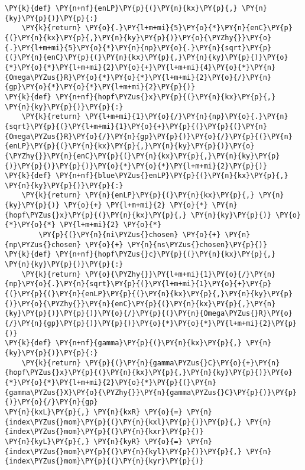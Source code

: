 \begin{Verbatim}[commandchars=\\\{\}]
\PY{k}{def} \PY{n+nf}{enLP}\PY{p}{(}\PY{n}{kx}\PY{p}{,} \PY{n}{ky}\PY{p}{)}\PY{p}{:}
    \PY{k}{return} \PY{o}{.}\PY{l+m+mi}{5}\PY{o}{*}\PY{n}{enC}\PY{p}{(}\PY{n}{kx}\PY{p}{,}\PY{n}{ky}\PY{p}{)}\PY{o}{\PYZhy{}}\PY{o}{.}\PY{l+m+mi}{5}\PY{o}{*}\PY{n}{np}\PY{o}{.}\PY{n}{sqrt}\PY{p}{(}\PY{n}{enC}\PY{p}{(}\PY{n}{kx}\PY{p}{,}\PY{n}{ky}\PY{p}{)}\PY{o}{*}\PY{o}{*}\PY{l+m+mi}{2}\PY{o}{+}\PY{l+m+mi}{4}\PY{o}{*}\PY{n}{Omega\PYZus{}R}\PY{o}{*}\PY{o}{*}\PY{l+m+mi}{2}\PY{o}{/}\PY{n}{gp}\PY{o}{*}\PY{o}{*}\PY{l+m+mi}{2}\PY{p}{)}
\PY{k}{def} \PY{n+nf}{hopf\PYZus{}x}\PY{p}{(}\PY{n}{kx}\PY{p}{,} \PY{n}{ky}\PY{p}{)}\PY{p}{:}
    \PY{k}{return} \PY{l+m+mi}{1}\PY{o}{/}\PY{n}{np}\PY{o}{.}\PY{n}{sqrt}\PY{p}{(}\PY{l+m+mi}{1}\PY{o}{+}\PY{p}{(}\PY{p}{(}\PY{n}{Omega\PYZus{}R}\PY{o}{/}\PY{n}{gp}\PY{p}{)}\PY{o}{/}\PY{p}{(}\PY{n}{enLP}\PY{p}{(}\PY{n}{kx}\PY{p}{,}\PY{n}{ky}\PY{p}{)}\PY{o}{\PYZhy{}}\PY{n}{enC}\PY{p}{(}\PY{n}{kx}\PY{p}{,}\PY{n}{ky}\PY{p}{)}\PY{p}{)}\PY{p}{)}\PY{o}{*}\PY{o}{*}\PY{l+m+mi}{2}\PY{p}{)}
\PY{k}{def} \PY{n+nf}{blue\PYZus{}enLP}\PY{p}{(}\PY{n}{kx}\PY{p}{,} \PY{n}{ky}\PY{p}{)}\PY{p}{:}
    \PY{k}{return} \PY{n}{enLP}\PY{p}{(}\PY{n}{kx}\PY{p}{,} \PY{n}{ky}\PY{p}{)} \PY{o}{+} \PY{l+m+mi}{2} \PY{o}{*} \PY{n}{hopf\PYZus{}x}\PY{p}{(}\PY{n}{kx}\PY{p}{,} \PY{n}{ky}\PY{p}{)} \PY{o}{*}\PY{o}{*} \PY{l+m+mi}{2} \PY{o}{*}
        \PY{p}{(}\PY{n}{ni\PYZus{}chosen} \PY{o}{+} \PY{n}{np\PYZus{}chosen} \PY{o}{+} \PY{n}{ns\PYZus{}chosen}\PY{p}{)}
\PY{k}{def} \PY{n+nf}{hopf\PYZus{}c}\PY{p}{(}\PY{n}{kx}\PY{p}{,} \PY{n}{ky}\PY{p}{)}\PY{p}{:}
    \PY{k}{return} \PY{o}{\PYZhy{}}\PY{l+m+mi}{1}\PY{o}{/}\PY{n}{np}\PY{o}{.}\PY{n}{sqrt}\PY{p}{(}\PY{l+m+mi}{1}\PY{o}{+}\PY{p}{(}\PY{p}{(}\PY{n}{enLP}\PY{p}{(}\PY{n}{kx}\PY{p}{,}\PY{n}{ky}\PY{p}{)}\PY{o}{\PYZhy{}}\PY{n}{enC}\PY{p}{(}\PY{n}{kx}\PY{p}{,}\PY{n}{ky}\PY{p}{)}\PY{p}{)}\PY{o}{/}\PY{p}{(}\PY{n}{Omega\PYZus{}R}\PY{o}{/}\PY{n}{gp}\PY{p}{)}\PY{p}{)}\PY{o}{*}\PY{o}{*}\PY{l+m+mi}{2}\PY{p}{)}
\PY{k}{def} \PY{n+nf}{gamma}\PY{p}{(}\PY{n}{kx}\PY{p}{,} \PY{n}{ky}\PY{p}{)}\PY{p}{:}
    \PY{k}{return} \PY{p}{(}\PY{n}{gamma\PYZus{}C}\PY{o}{+}\PY{n}{hopf\PYZus{}x}\PY{p}{(}\PY{n}{kx}\PY{p}{,}\PY{n}{ky}\PY{p}{)}\PY{o}{*}\PY{o}{*}\PY{l+m+mi}{2}\PY{o}{*}\PY{p}{(}\PY{n}{gamma\PYZus{}X}\PY{o}{\PYZhy{}}\PY{n}{gamma\PYZus{}C}\PY{p}{)}\PY{p}{)}\PY{o}{/}\PY{n}{gp}
\PY{n}{kxL}\PY{p}{,} \PY{n}{kxR} \PY{o}{=} \PY{n}{index\PYZus{}mom}\PY{p}{(}\PY{n}{kxl}\PY{p}{)}\PY{p}{,} \PY{n}{index\PYZus{}mom}\PY{p}{(}\PY{n}{kxr}\PY{p}{)}
\PY{n}{kyL}\PY{p}{,} \PY{n}{kyR} \PY{o}{=} \PY{n}{index\PYZus{}mom}\PY{p}{(}\PY{n}{kyl}\PY{p}{)}\PY{p}{,} \PY{n}{index\PYZus{}mom}\PY{p}{(}\PY{n}{kyr}\PY{p}{)}

\end{Verbatim}

